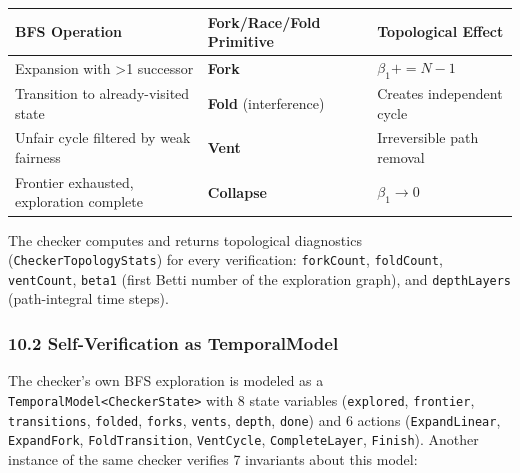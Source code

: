 \documentclass[
  11pt,
]{article}
\newcounter{none} %
\begin{document}
{\def\LTcaptype{none} %
\begin{longtable}[]{@{}
  >{\raggedright\arraybackslash}p{}
  >{\raggedright\arraybackslash}p{}
  >{\raggedright\arraybackslash}p{}@{}}
\toprule\noalign{}
\begin{minipage}[b]{\linewidth}\raggedright
BFS Operation
\end{minipage} & \begin{minipage}[b]{\linewidth}\raggedright
Fork/Race/Fold Primitive
\end{minipage} & \begin{minipage}[b]{\linewidth}\raggedright
Topological Effect
\end{minipage} \\
\midrule\noalign{}
\endhead
\bottomrule\noalign{}
\endlastfoot
Expansion with \textgreater1 successor & \textbf{Fork} &
\(\beta_1 += N - 1\) \\
Transition to already-visited state & \textbf{Fold} (interference) &
Creates independent cycle \\
Unfair cycle filtered by weak fairness & \textbf{Vent} & Irreversible
path removal \\
Frontier exhausted, exploration complete & \textbf{Collapse} &
\(\beta_1 \to 0\) \\
\end{longtable}
}

The checker computes and returns topological diagnostics
(\texttt{CheckerTopologyStats}) for every verification:
\texttt{forkCount}, \texttt{foldCount}, \texttt{ventCount},
\texttt{beta1} (first Betti number of the exploration graph), and
\texttt{depthLayers} (path-integral time steps).

\subsubsection{10.2 Self-Verification as
TemporalModel}\label{self-verification-as-temporalmodel}

The checker's own BFS exploration is modeled as a
\texttt{TemporalModel\textless{}CheckerState\textgreater{}} with 8 state
variables (\texttt{explored}, \texttt{frontier}, \texttt{transitions},
\texttt{folded}, \texttt{forks}, \texttt{vents}, \texttt{depth},
\texttt{done}) and 6 actions (\texttt{ExpandLinear},
\texttt{ExpandFork}, \texttt{FoldTransition}, \texttt{VentCycle},
\texttt{CompleteLayer}, \texttt{Finish}). Another instance of the same
checker verifies 7 invariants about this model:
\end{document}
